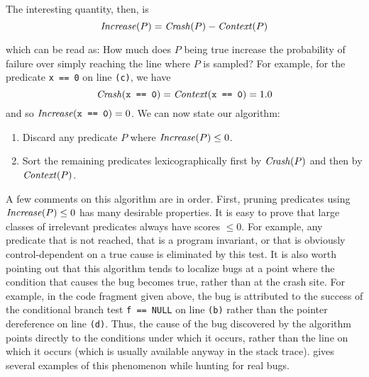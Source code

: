 The interesting quantity, then, is
\begin{equation}
 \mbox{\textit{Increase}}(P) = \mbox{\textit{Crash}}(P) - \mbox{\textit{Context}}(P) \label{eqn:1}
\end{equation}

which can be read as: How much does $P$ being true increase the probability of failure
over simply reaching the line where $P$ is sampled?  For example, for the predicate {\tt x == 0} on line {\tt (c)},
we have
\[\mbox{\textit{Crash}}(\mbox{\tt x == 0}) = \mbox{\textit{Context}}(\mbox{\tt x == 0}) = 1.0 \]
and so $\mbox{\textit{Increase}}(\mbox{\tt x == 0}) = 0$.
We can now state our algorithm:
\begin{enumerate}
\item Discard any predicate $P$ where $\mbox{\textit{Increase}}(P) \leq 0$.

\item Sort the remaining predicates lexicographically first by $\mbox{\textit{Crash}}(P)$ and then by $\mbox{\textit{Context}}(P)$.
\end{enumerate}

A few comments on this algorithm are in order.  First, pruning
predicates using $\mbox{\textit{Increase}}(P) \leq 0$ has many desirable
properties.  It is easy to prove that large classes of irrelevant
predicates always have scores $\leq 0$.  For example, any predicate
that is not reached, that is a program invariant, or that is obviously
control-dependent on a true cause is eliminated by this test.  It is
also worth pointing out that this algorithm tends to localize bugs at
a point where the condition that causes the bug becomes true, rather than at
the crash site.  For example, in the code fragment given above, the bug is
attributed to the success of the conditional branch test {\tt f ==
NULL} on line {\tt (b)} rather than the pointer dereference on line
{\tt (d)}.  Thus, the cause of the bug discovered by the algorithm
points directly to the conditions under which it occurs, rather than
the line on which it occurs (which is usually available anyway in the
stack trace).  gives several examples
of this phenomenon while hunting for real bugs.


